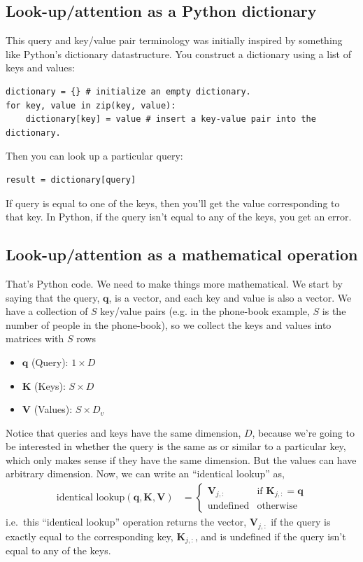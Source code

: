 \documentclass{article}
\begin{document}
\subsection{Look-up/attention as a Python dictionary}

This query and key/value pair terminology was initially inspired by something like Python's dictionary datastructure.
You construct a dictionary using a list of keys and values:
\begin{verbatim}
dictionary = {} # initialize an empty dictionary.
for key, value in zip(key, value):
    dictionary[key] = value # insert a key-value pair into the dictionary.
\end{verbatim}
Then you can look up a particular query:
\begin{verbatim}
result = dictionary[query]
\end{verbatim}
If query is equal to one of the keys, then you'll get the value corresponding to that key.
In Python, if the query isn't equal to any of the keys, you get an error.

\subsection{Look-up/attention as a mathematical operation}

That's Python code.  We need to make things more mathematical.
We start by saying that the query, $\mathbf{q}$, is a vector, and each key and value is also a vector.
We have a collection of $S$ key/value pairs (e.g. in the phone-book example, $S$ is the number of people in the phone-book), so we collect the keys and values into matrices with $S$ rows 
\begin{itemize}
  \item $\mathbf{q}$ (Query): $1 \times D$
  \item $\mathbf{K}$ (Keys): $S \times D$
  \item $\mathbf{V}$ (Values): $S \times D_v$
\end{itemize}
Notice that queries and keys have the same dimension, $D$, because we're going to be interested in whether the query is the same as or similar to a particular key, which only makes sense if they have the same dimension.
But the values can have arbitrary dimension.
Now, we can write an ``identical lookup'' as,
\begin{align}
  \text{identical lookup}(\mathbf{q}, \mathbf{K}, \mathbf{V}) &= \begin{cases}
    \mathbf{V}_{j, :} & \text{if } \mathbf{K}_{j, :} = \mathbf{q}\\
    \text{undefined} & \text{otherwise}
  \end{cases}
\end{align}
i.e.\ this ``identical lookup'' operation returns the vector, $\mathbf{V}_{j, :}$ if the query is exactly equal to the corresponding key, $\mathbf{K}_{j, :}$, and is undefined if the query isn't equal to any of the keys.
\end{document}
